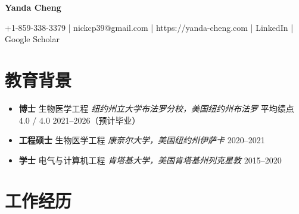 \documentclass[letterpaper,10pt]{article}
\begin{document}
\begin{center}
  {\huge \textbf{Yanda Cheng}}
\end{center}
\vspace{4pt}
\noindent
+1-859-338-3379 \quad|\quad
nickcp39@gmail.com \quad|\quad
https://yanda-cheng.com \quad|\quad
LinkedIn \quad|\quad
Google Scholar

\vspace{-4pt}

\section{教育背景}

\begin{itemize}[leftmargin=0.0in, label={}, itemsep=2pt, topsep=2pt]
  \item \textbf{博士} 生物医学工程 \hfill \textit{纽约州立大学布法罗分校，美国纽约州布法罗} \hfill 平均绩点 4.0 / 4.0 \hfill 2021--2026（预计毕业）
  \item \textbf{工程硕士} 生物医学工程 \hfill \textit{康奈尔大学，美国纽约州伊萨卡} \hfill 2020--2021
  \item \textbf{学士} 电气与计算机工程 \hfill \textit{肯塔基大学，美国肯塔基州列克星敦} \hfill 2015--2020
\end{itemize}

\vspace{-2pt}

\section{工作经历}
\end{document}
